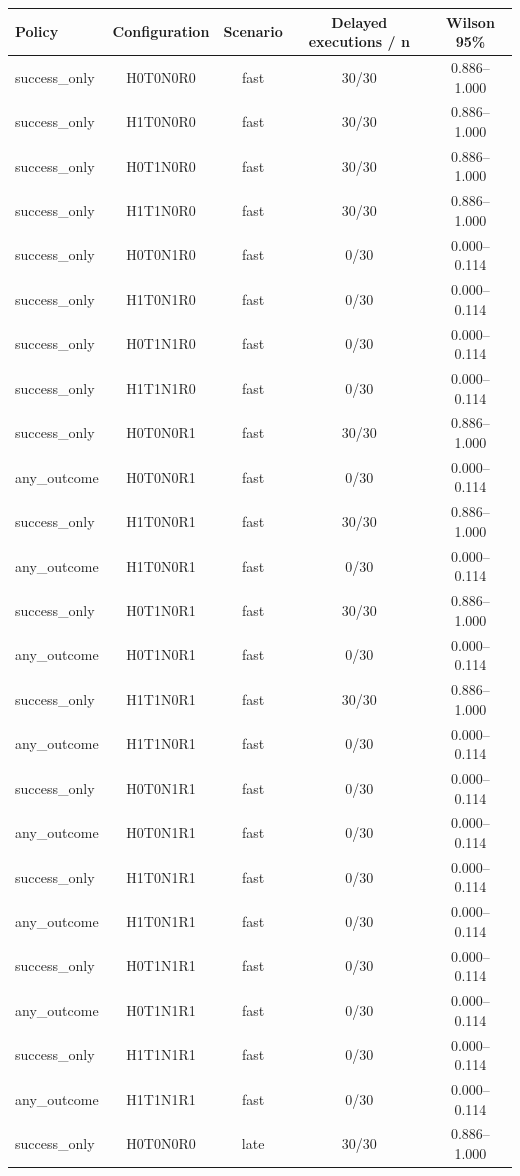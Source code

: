 \begin{table}[t]
\centering
\small
\begin{tabular}{lcccc}
\toprule
Policy & Configuration & Scenario & Delayed executions / n & Wilson 95\% \\
\midrule
success\_only & H0T0N0R0 & fast & 30/30 & 0.886–1.000 \\
success\_only & H1T0N0R0 & fast & 30/30 & 0.886–1.000 \\
success\_only & H0T1N0R0 & fast & 30/30 & 0.886–1.000 \\
success\_only & H1T1N0R0 & fast & 30/30 & 0.886–1.000 \\
success\_only & H0T0N1R0 & fast & 0/30 & 0.000–0.114 \\
success\_only & H1T0N1R0 & fast & 0/30 & 0.000–0.114 \\
success\_only & H0T1N1R0 & fast & 0/30 & 0.000–0.114 \\
success\_only & H1T1N1R0 & fast & 0/30 & 0.000–0.114 \\
success\_only & H0T0N0R1 & fast & 30/30 & 0.886–1.000 \\
any\_outcome & H0T0N0R1 & fast & 0/30 & 0.000–0.114 \\
success\_only & H1T0N0R1 & fast & 30/30 & 0.886–1.000 \\
any\_outcome & H1T0N0R1 & fast & 0/30 & 0.000–0.114 \\
success\_only & H0T1N0R1 & fast & 30/30 & 0.886–1.000 \\
any\_outcome & H0T1N0R1 & fast & 0/30 & 0.000–0.114 \\
success\_only & H1T1N0R1 & fast & 30/30 & 0.886–1.000 \\
any\_outcome & H1T1N0R1 & fast & 0/30 & 0.000–0.114 \\
success\_only & H0T0N1R1 & fast & 0/30 & 0.000–0.114 \\
any\_outcome & H0T0N1R1 & fast & 0/30 & 0.000–0.114 \\
success\_only & H1T0N1R1 & fast & 0/30 & 0.000–0.114 \\
any\_outcome & H1T0N1R1 & fast & 0/30 & 0.000–0.114 \\
success\_only & H0T1N1R1 & fast & 0/30 & 0.000–0.114 \\
any\_outcome & H0T1N1R1 & fast & 0/30 & 0.000–0.114 \\
success\_only & H1T1N1R1 & fast & 0/30 & 0.000–0.114 \\
any\_outcome & H1T1N1R1 & fast & 0/30 & 0.000–0.114 \\
success\_only & H0T0N0R0 & late & 30/30 & 0.886–1.000 \\

\end{tabular}
\end{table}
